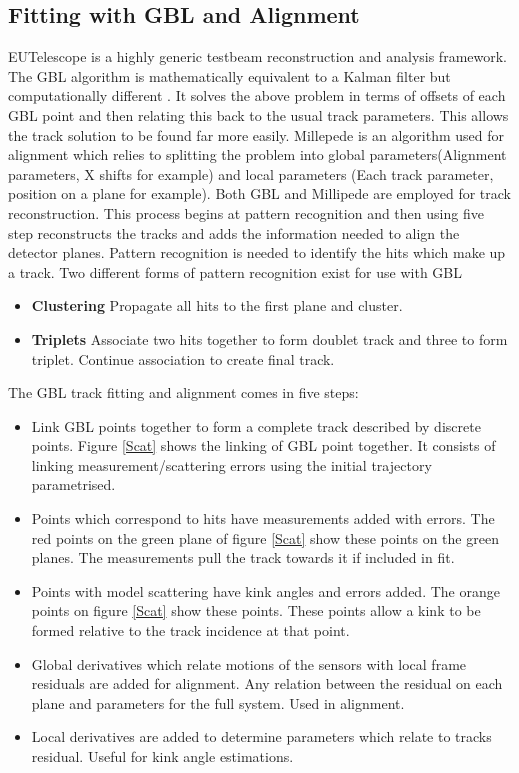 \documentclass[a0,portrait]{a0poster}
\begin{document}
\begin{multicols}{2}
\begin{tcolorbox}
\subsection*{Fitting with GBL and Alignment}
EUTelescope is a highly generic testbeam reconstruction and analysis framework\cite{eutel}. The GBL algorithm is mathematically equivalent to a Kalman filter but computationally different \cite{claus1}. It solves the above problem in terms of offsets of each GBL point and then relating this back to the usual track parameters. This allows the track solution to be found far more easily. Millepede is an algorithm used for alignment which relies to splitting the problem into global parameters(Alignment parameters, X shifts for example) and local parameters (Each track parameter, position on a plane for example)\cite{blobel}. Both GBL and Millipede are employed for track reconstruction. This process begins at pattern recognition and then using five step reconstructs the tracks and adds the information needed to align the detector planes. 
Pattern recognition is needed to identify the hits which make up a track. Two different forms of pattern recognition exist for use with GBL
\begin{itemize}
\item \textbf{Clustering} Propagate all hits to the first plane and cluster. 
\item \textbf{Triplets} Associate two hits together to form doublet track and three to form triplet. Continue association to create final track.
\end{itemize}

The GBL track fitting and alignment comes in five steps:
\begin{itemize}
\item Link GBL points together to form a complete track described by discrete points.
Figure \ref{Scat} shows the linking of GBL point together. It consists of linking measurement/scattering errors using the initial trajectory parametrised.
\item Points which correspond to hits have measurements added with errors. The red points on the green plane of figure \ref{Scat} show these points on the green planes. The measurements pull the track towards it if included in fit.
\item Points with model scattering have kink angles and errors added. The orange points on figure \ref{Scat} show these points. These points allow a kink to be formed relative to the track incidence at that point.
\item Global derivatives which relate motions of the sensors with local frame residuals are added for alignment.
Any relation between the residual on each plane and parameters for the full system. Used in alignment.
\item Local derivatives are added to determine parameters which relate to tracks residual. Useful for kink angle estimations.
\end{itemize}


\end{tcolorbox}
\end{multicols}
\end{document}

